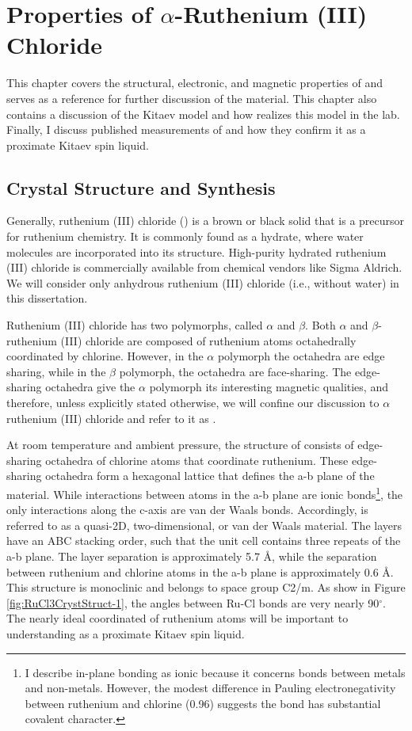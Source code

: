 \chapter{Properties of \texorpdfstring{$\alpha$-Ruthenium (III) Chloride}{alpha-RuCl3}}
This chapter covers the structural, electronic, and magnetic properties of \rucl and serves as a reference for further discussion of the material. This chapter also contains a discussion of the Kitaev model and how \rucl realizes this model in the lab. Finally, I discuss published measurements of \rucl and how they confirm it as a proximate Kitaev spin liquid.

\section{Crystal Structure and Synthesis}

Generally, ruthenium (III) chloride (\ruclnospace) is a brown or black solid that is a precursor for 	ruthenium chemistry. It is commonly found as a hydrate, where water molecules are incorporated into its structure. High-purity hydrated ruthenium (III) chloride is commercially available from chemical vendors like Sigma Aldrich. We will consider only anhydrous ruthenium (III) chloride (i.e., without water) in this dissertation.

Ruthenium (III) chloride has two polymorphs, called $\alpha$ and $\beta$. Both $\alpha$ and $\beta$-ruthenium (III) chloride are composed of ruthenium atoms octahedrally coordinated by chlorine. However, in the $\alpha$ polymorph the octahedra are edge sharing, while in the $\beta$ polymorph, the octahedra are face-sharing. The edge-sharing octahedra give the $\alpha$ polymorph its interesting magnetic qualities, and therefore, unless explicitly stated otherwise, we will confine our discussion to $\alpha$ ruthenium (III) chloride and refer to it as \ruclnospace .

At room temperature and ambient pressure, the structure of \rucl consists of edge-sharing octahedra of chlorine atoms that coordinate ruthenium. These edge-sharing octahedra form a hexagonal lattice that defines the a-b plane of the material. While interactions between atoms in the a-b plane are ionic bonds\footnote{I describe in-plane bonding as ionic because it concerns bonds between metals and non-metals. However, the modest difference in Pauling electronegativity between ruthenium and chlorine (0.96) suggests the bond has substantial covalent character.}, the only interactions along the c-axis are van der Waals bonds. Accordingly, \rucl is referred to as a quasi-2D, two-dimensional, or van der Waals material. The layers have an ABC stacking order, such that the unit cell contains three repeats of the a-b plane. The layer separation is approximately 5.7 \AA, while the separation between ruthenium and chlorine atoms in the a-b plane is approximately 0.6 \AA. This structure is monoclinic and belongs to space group C2/m. As show in Figure \ref{fig:RuCl3CrystStruct-1}, the angles between Ru-Cl bonds are very nearly 90$^{\circ}$. The nearly ideal coordinated of ruthenium atoms will be important to understanding \rucl as a proximate Kitaev spin liquid.

